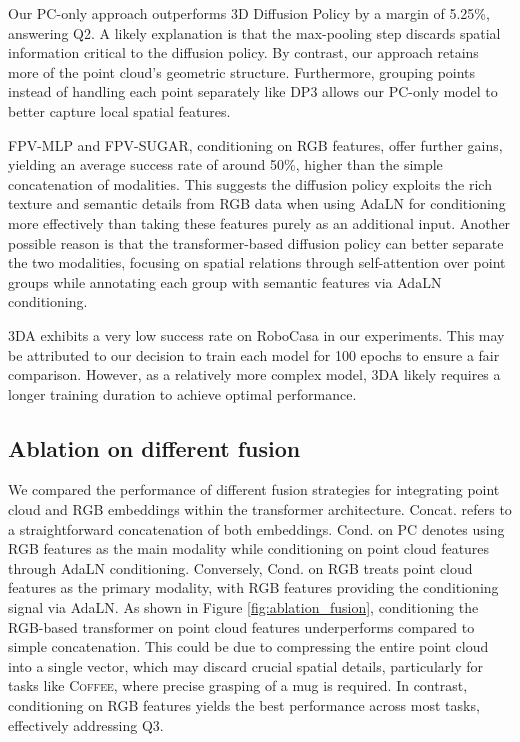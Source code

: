 Our PC-only approach outperforms 3D Diffusion Policy by a margin of 5.25\%, answering Q2. A likely explanation is that the max-pooling step discards spatial information critical to the diffusion policy. By contrast, our approach retains more of the point cloud’s geometric structure. Furthermore, grouping points instead of handling each point separately like DP3 allows our PC-only model to better capture local spatial features.

FPV-MLP and FPV-SUGAR, conditioning on RGB features, offer further gains, yielding an average success rate of around 50\%, higher than the simple concatenation of modalities. This suggests the diffusion policy exploits the rich texture and semantic details from RGB data when using AdaLN for conditioning more effectively than taking these features purely as an additional input. Another possible reason is that the transformer-based diffusion policy can better separate the two modalities, focusing on spatial relations through self-attention over point groups while annotating each group with semantic features via AdaLN conditioning.

3DA exhibits a very low success rate on RoboCasa in our experiments. This may be attributed to our decision to train each model for 100 epochs to ensure a fair comparison. However, as a relatively more complex model, 3DA likely requires a longer training duration to achieve optimal performance.


\subsection{Ablation on different fusion}


We compared the performance of different fusion strategies for integrating point cloud and RGB embeddings within the transformer architecture. Concat. refers to a straightforward concatenation of both embeddings. Cond. on PC denotes using RGB features as the main modality while conditioning on point cloud features through AdaLN conditioning. Conversely, Cond. on RGB treats point cloud features as the primary modality, with RGB features providing the conditioning signal via AdaLN. As shown in Figure \ref{fig:ablation_fusion}, conditioning the RGB-based transformer on point cloud features underperforms compared to simple concatenation. This could be due to compressing the entire point cloud into a single vector, which may discard crucial spatial details, particularly for tasks like \textsc{Coffee}, where precise grasping of a mug is required. In contrast, conditioning on RGB features yields the best performance across most tasks, effectively addressing Q3.

